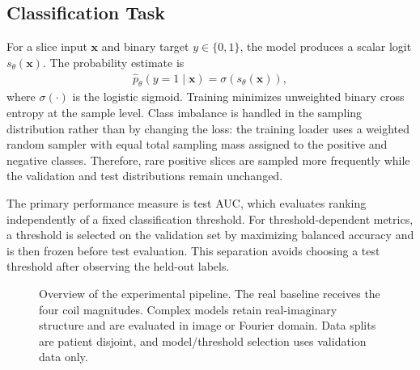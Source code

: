 \documentclass[journal]{IEEEtran}
\begin{document}
\subsection{Classification Task}
For a slice input $\mathbf{x}$ and binary target $y\in\{0,1\}$, the model produces a scalar logit $s_\theta(\mathbf{x})$. The probability estimate is
\begin{align}
\hat p_\theta(y=1\mid\mathbf{x})
= \sigma(s_\theta(\mathbf{x})),
\end{align}
where $\sigma(\cdot)$ is the logistic sigmoid. Training minimizes unweighted binary cross entropy at the sample level. Class imbalance is handled in the sampling distribution rather than by changing the loss: the training loader uses a weighted random sampler with equal total sampling mass assigned to the positive and negative classes. Therefore, rare positive slices are sampled more frequently while the validation and test distributions remain unchanged.

The primary performance measure is test \ac{AUC}, which evaluates ranking independently of a fixed classification threshold. For threshold-dependent metrics, a threshold is selected on the validation set by maximizing balanced accuracy and is then frozen before test evaluation. This separation avoids choosing a test threshold after observing the held-out labels.

\begin{figure}[t]
\centering
{}
\caption{\small Overview of the experimental pipeline. The real baseline receives the four coil magnitudes. Complex models retain real-imaginary structure and are evaluated in image or Fourier domain. Data splits are patient disjoint, and model/threshold selection uses validation data only.}
\label{fig:pipeline}
\end{figure}
\end{document}
